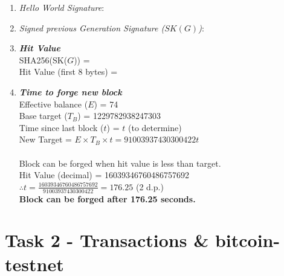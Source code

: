 \documentclass[11pt]{article}
\begin{document}
\begin{enumerate}
\item \textit{Hello World Signature}: \texttt{}

\item \textit{Signed previous Generation Signature ($SK(G)$)}: \texttt{}

\item \textbf{\textit{Hit Value}}\\
SHA256(SK($G$)) = \texttt{}\\
Hit Value (first 8 bytes) = \textbf{\texttt{}}

\item \textbf{\textit{Time to forge new block}}\\
Effective balance ($E$) = 74\\
Base target ($T_B$) = 1229782938247303\\
Time since last block ($t$) = $t$ (to determine)\\
New Target = $E\times T_B\times t=91003937430300422t$\\
\\
Block can be forged when hit value is less than target.\\
Hit Value (decimal) = 16039346760486757692\\
$\therefore t=\frac{16039346760486757692}{91003937430300422}=176.25$ (2 d.p.)\\
\textbf{Block can be forged after 176.25 seconds.}


\end{enumerate}

\section*{Task 2 - Transactions \& bitcoin-testnet}
\end{document}
